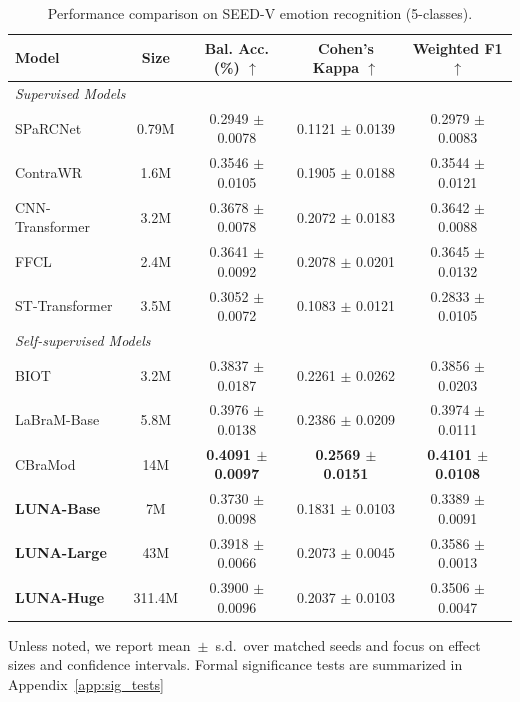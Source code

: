 \vspace{-3mm}
\begin{table}[htbp!]
    \centering
    \caption{Performance comparison on SEED-V emotion recognition (5-classes).}
    \label{tab:emotion_classification}
    \small
    \begin{tabular}{@{}lcccc@{}}
        \toprule
        \textbf{Model} & \textbf{Size} & \textbf{Bal. Acc. (\%)} $\uparrow$ & \textbf{Cohen’s Kappa } $\uparrow$ & \textbf{Weighted F1} $\uparrow$ \\
        \midrule
         \multicolumn{5}{l}{\textit{Supervised Models}} \\
        SPaRCNet~\cite{jing2023development} &0.79M&0.2949 $\pm$ 0.0078 &0.1121 $\pm$ 0.0139 &0.2979 $\pm$ 0.0083 \\
        ContraWR~\cite{yang2021self}&1.6M&0.3546 $\pm$ 0.0105 &0.1905 $\pm$ 0.0188 &0.3544 $\pm$ 0.0121 \\
        CNN-Transformer~\cite{peh2022transformer}&3.2M&0.3678 $\pm$ 0.0078& 0.2072 $\pm$ 0.0183&0.3642 $\pm$ 0.0088 \\
        FFCL~\cite{li2022motor}  &    2.4M &0.3641 $\pm$ 0.0092 &0.2078 $\pm$ 0.0201&0.3645 $\pm$ 0.0132\\
        ST-Transformer~\cite{song2021transformer} &3.5M &0.3052 $\pm$ 0.0072 &0.1083 $\pm$ 0.0121 &0.2833 $\pm$ 0.0105 \\
						\midrule
        \multicolumn{5}{l}{\textit{Self-supervised Models}} \\
        BIOT \citep{yang2023biot} & 3.2M & 0.3837 $\pm$ 0.0187 & 0.2261 $\pm$ 0.0262 &  0.3856 $\pm$ 0.0203 \\
        LaBraM-Base \citep{jiang2024large} & 5.8M & 0.3976 $\pm$ 0.0138 & 0.2386 $\pm$ 0.0209 & 0.3974 $\pm$ 0.0111 \\
        CBraMod \citep{wang2024cbramod} & 14M & \textbf{0.4091 $\pm$ 0.0097} & \textbf{0.2569 $\pm$ 0.0151} & \textbf{0.4101 $\pm$ 0.0108} \\
        \midrule
        
        \textbf{LUNA-Base} & 7M & 0.3730 $\pm$ 0.0098 & 0.1831 $\pm$ 0.0103 & 0.3389 $\pm$ 0.0091 \\
        \textbf{LUNA-Large} & 43M & 0.3918 $\pm$ 0.0066 & 0.2073 $\pm$ 0.0045 & 0.3586 $\pm$ 0.0013 \\
        \textbf{LUNA-Huge} & 311.4M & 0.3900 $\pm$ 0.0096 & 0.2037 $\pm$ 0.0103 & 0.3506 $\pm$ 0.0047 \\
        \bottomrule
    \end{tabular}
\end{table}
Unless noted, we report mean~$\pm$~s.d.\ over matched seeds and focus on effect sizes and confidence intervals. Formal significance tests are summarized in Appendix~\ref{app:sig_tests}

